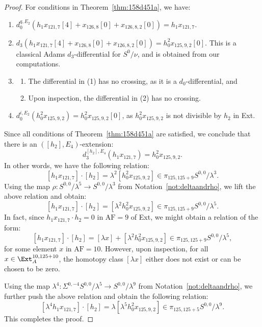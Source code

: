 \documentclass{amsart}
\numberwithin{equation}{section}
\newcommand{\AF}{\mathrm{AF}}
\begin{document}
\begin{proof}
For conditions in Theorem~\ref{thm:158d451a}, we have:
\begin{enumerate}
      \item $d_0^{q, E_2}(h_1 x_{121,7} [4] + x_{126,8}[0] + x_{126,8,2}[0]) = h_1 x_{121,7}$.
      \item $d_3 (h_1 x_{121,7} [4] + x_{126,8}[0] + x_{126,8,2}[0]) = h_0^2 x_{125,9,2} [0]$. This is a classical Adams $d_3$-differential for $S^0/\nu$, and is obtained from our computations.
      \item 
      \begin{enumerate}
          \item The differential in (1) has no crossing, as it is a $d_0$-differential, and
          \item Upon inspection, the differential in (2) has no crossing. 
      \end{enumerate}
      \item 
      $d_0^{i, E_2} (h_0^2 x_{125,9,2}) = h_0^2 x_{125,9,2}[0]$, as $h_0^2 x_{125,9,2}$ is not divisible by $h_2$ in Ext.
      \end{enumerate}
    Since all conditions of Theorem~\ref{thm:158d451a} are  satisfied, we conclude that there is an $([h_2], E_4)$-extension:
        $$d_3^{[h_2], E_4} (h_1 x_{121,7}) = h_0^2 x_{125,9,2}.$$
In other words, we have the following relation:
      $$[h_1 x_{121,7}] \cdot [h_2] = \lambda^2 [h_0^2 x_{125,9,2}] \in \pi_{125,125+9} S^{0,0}/\lambda^3.$$  
Using the map $\rho:S^{0,0}/\lambda^5 \rightarrow S^{0,0}/\lambda^3$ from Notation~\ref{not:deltaandrho}, we lift the above relation and obtain:
$$[h_1 x_{121,7}] \cdot [h_2] = [\lambda^2 h_0^2 x_{125,9,2}] \in \pi_{125,125+9} S^{0,0}/\lambda^5.$$
In fact, since $h_1 x_{121,7} \cdot h_2 = 0$ in $\AF=9$ of Ext, we might obtain a relation of the form:
$$[h_1 x_{121,7}] \cdot [h_2] = [\lambda x] + [\lambda^2 h_0^2 x_{125,9,2}] \in \pi_{125,125+9} S^{0,0}/\lambda^5,$$
for some element $x$ in $\AF=10$. However, upon inspection, for all $x \in  \Ext_A^{10,125+10}$, the homotopy class $[\lambda x]$ either does not exist or can be chosen to be zero.




Using the map $\lambda^4: \Sigma^{0,-4}S^{0,0}/\lambda^5 \rightarrow S^{0,0}/\lambda^9$ from Notation~\ref{not:deltaandrho}, we further push the above relation and obtain the following relation:
$$[\lambda^4 h_1 x_{121,7}] \cdot [h_2] = \lambda [\lambda^5 h_0^2 x_{125,9,2}] \in \pi_{125,125+5} S^{0,0}/\lambda^9.$$
This completes the proof.
\end{proof}
\end{document}
